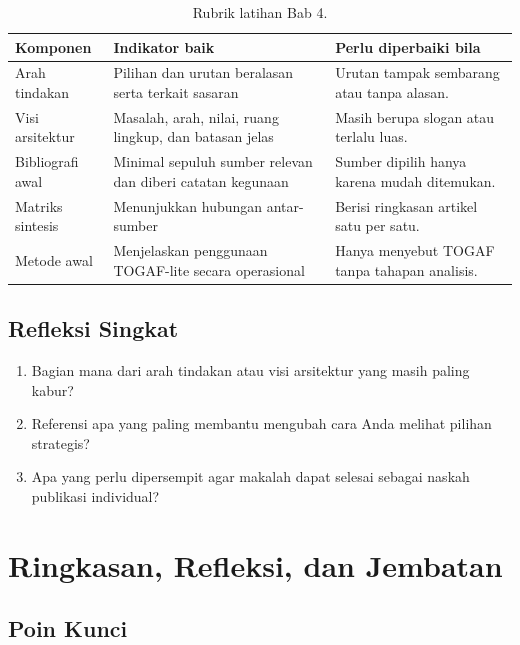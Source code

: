 \begin{table}[htbp]
\centering
\scriptsize
\caption{Rubrik latihan Bab 4.}
\label{tab:rubrik-bab3}
\begin{tabularx}{\textwidth}{@{}p{} X X@{}}
\hline
\textbf{Komponen} & \textbf{Indikator baik} & \textbf{Perlu diperbaiki bila} \\
\hline
Arah tindakan & Pilihan dan urutan beralasan serta terkait sasaran & Urutan
tampak sembarang atau tanpa alasan. \\
Visi arsitektur & Masalah, arah, nilai, ruang lingkup, dan batasan jelas &
Masih berupa slogan atau terlalu luas. \\
Bibliografi awal & Minimal sepuluh sumber relevan dan diberi catatan kegunaan
& Sumber dipilih hanya karena mudah ditemukan. \\
Matriks sintesis & Menunjukkan hubungan antar-sumber & Berisi ringkasan artikel
satu per satu. \\
Metode awal & Menjelaskan penggunaan TOGAF-lite secara operasional & Hanya
menyebut TOGAF tanpa tahapan analisis. \\
\hline
\end{tabularx}
\end{table}

\subsection*{Refleksi Singkat}

\begin{enumerate}
  \item Bagian mana dari arah tindakan atau visi arsitektur yang masih paling
        kabur?
  \item Referensi apa yang paling membantu mengubah cara Anda melihat pilihan
        strategis?
  \item Apa yang perlu dipersempit agar makalah dapat selesai sebagai naskah
        publikasi individual?
\end{enumerate}

\section{Ringkasan, Refleksi, dan Jembatan}

\subsection*{Poin Kunci}

